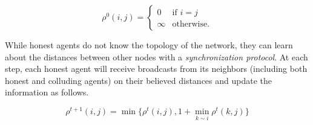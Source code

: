\documentclass{comnet}
\providecommand{\DIFaddbegin}{} %
\providecommand{\DIFaddend}{} %
\providecommand{\DIFdelbegin}{} %
\providecommand{\DIFdelend}{} %
\begin{document}
\begin{equation} \DIFdelbegin %
\DIFdelend \DIFaddbegin \label{uniformrho}
   \DIFaddend \rho^0(i,j) =
    \DIFdelbegin %
\DIFdelend \DIFaddbegin \begin{cases}
        0 & \text{if } i = j \\
        \infty & \text{otherwise.}
    \end{cases}
\DIFaddend \end{equation}

While honest agents do not know the topology of the network, they can learn
about the distances between other nodes with a {\it synchronization protocol}.
At each step, each honest agent will receive broadcasts from its neighbors
(including both honest and colluding agents) on their believed distances and
update the information as follows.

\begin{equation}
   \rho^{t+1}(i,j) = \min \{ \rho^{t}(i,j), 1 + \min_{k \sim i} \rho^{t}(k,j) \} \label{uniformd}
\end{equation}

\DIFdelbegin %

\end{document}
